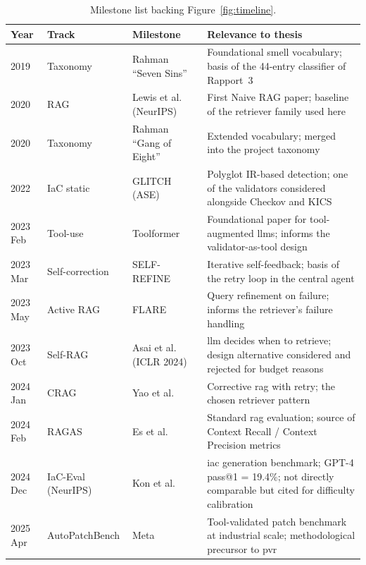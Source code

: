 \documentclass[12pt, a4paper]{report}
\begin{document}
\begin{table}[H]
  \centering
  \caption{Milestone list backing Figure~\ref{fig:timeline}.}
  \label{tab:timeline}
  \small
  \begin{tabularx}{\linewidth}{lll X}
    \toprule
    \textbf{Year} & \textbf{Track} & \textbf{Milestone} & \textbf{Relevance to thesis} \\
    \midrule
    2019 & Taxonomy & Rahman ``Seven Sins''~\citep{rahman2019seven} & Foundational smell vocabulary; basis of the 44-entry classifier of Rapport~3 \\
    2020 & RAG & Lewis et al. (NeurIPS) & First Naive RAG paper; baseline of the retriever family used here \\
    2020 & Taxonomy & Rahman ``Gang of Eight''~\citep{rahman2020gang} & Extended vocabulary; merged into the project taxonomy \\
    2022 & IaC static & GLITCH~\citep{saavedra2022glitch} (ASE) & Polyglot IR-based detection; one of the validators considered alongside Checkov and KICS \\
    2023 Feb & Tool-use & Toolformer~\citep{schick2023toolformer} & Foundational paper for tool-augmented \glspl{llm}; informs the validator-as-tool design \\
    2023 Mar & Self-correction & SELF-REFINE~\citep{madaan2023selfrefine} & Iterative self-feedback; basis of the retry loop in the central agent \\
    2023 May & Active RAG & FLARE~\citep{jiang2023flare} & Query refinement on failure; informs the retriever's failure handling \\
    2023 Oct & Self-RAG & Asai et al.~\citep{asai2023selfrag} (ICLR 2024) & \gls{llm} decides when to retrieve; design alternative considered and rejected for budget reasons \\
    2024 Jan & CRAG & Yao et al.~\citep{yao2024crag} & Corrective \gls{rag} with retry; the chosen retriever pattern \\
    2024 Feb & RAGAS & Es et al.~\citep{es2024ragas} & Standard \gls{rag} evaluation; source of Context Recall / Context Precision metrics \\
    2024 Dec & IaC-Eval (NeurIPS) & Kon et al.~\citep{kon2024iaceval} & \gls{iac} generation benchmark; GPT-4 pass@1 = 19.4\%; not directly comparable but cited for difficulty calibration \\
    2025 Apr & AutoPatchBench & Meta~\citep{autopatchbench2025} & Tool-validated patch benchmark at industrial scale; methodological precursor to \gls{pvr} \\

\end{tabularx}
\end{table}
\end{document}
